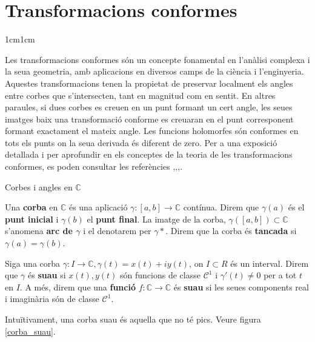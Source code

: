 \section{Transformacions conformes}

\begin{adjustwidth}{1cm}{1cm}

    Les transformacions conformes són un concepte fonamental en l'anàlisi complexa i la seua geometria, amb aplicacions en diversos camps de la ciència i l'enginyeria. Aquestes transformacions tenen la propietat de preservar localment els angles entre corbes que s'intersecten, tant en magnitud com en sentit. En altres paraules, si dues corbes es creuen en un punt formant un cert angle, les seues imatges baix una transformació conforme es creuaran en el punt corresponent formant exactament el mateix angle. Les funcions holomorfes són conformes en tots els punts on la seua derivada és diferent de zero. Per a una exposició detallada i per aprofundir en els conceptes de la teoria de les transformacions conformes, es poden consultar les referències \cite[Cap.3, Secció 2]{ahlfors},\cite[Cap.8]{bruna},\cite[Cap.2]{needham},\cite[Cap.14]{rudin}.

    \begin{subsection}{Corbes i angles en \texorpdfstring{$\mathbb{C}$}{C}}
        
    \begin{definicio}
        Una \textbf{corba} en $\mathbb{C}$ és una aplicació $\gamma:[a,b]\to \mathbb{C}$ contínua. Direm que $\gamma(a)$ és el \textbf{punt inicial} i $\gamma(b)$ el \textbf{punt final}. La imatge de la corba, $\gamma([a,b])\subset \mathbb{C}$ s'anomena \textbf{arc de $\gamma$} i el denotarem per $\gamma*$. Direm que la corba és \textbf{tancada} si $\gamma(a)=\gamma(b)$.
    \end{definicio}    

    \begin{definicio}
        Siga una corba $\gamma:I \to \mathbb{C}, \gamma(t)=x(t)+iy(t)$, on $I\subset R$ és un interval. Direm que $\gamma$ és \textbf{suau} si $x(t), y(t)$ són funcions de classe $\mathcal{C}^1$ i $\gamma'(t)\neq 0 $ per a tot $t$ en $I$. A més, direm que una \textbf{funció} $f:\mathbb{C}\to \mathbb{C}$ és \textbf{suau} si les seues components real i imaginària són de classe $\mathcal{C}^1$.
    \end{definicio}

    Intuïtivament, una corba suau és aquella que no té pics. Veure figura \ref{corba_suau}.


\end{subsection}
\end{adjustwidth}
